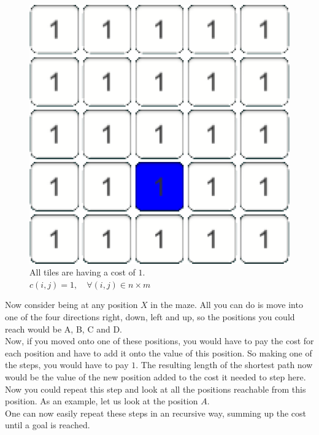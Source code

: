 \documentclass[conference]{IEEEtran}
\begin{document}
\begin{figure}[h]
\centering
\begin{minipage}[t]{0.3\linewidth}
\centering
\includegraphics[width=1\textwidth]{images/ValueFunction/original.png}
\end{minipage}
\caption{All tiles are having a cost of
$1$.\\
$c(i,j) = 1, \quad \forall (i,j) \in n \times m$}
\end{figure}
Now consider being at any position $X$ in the maze. All you can do is move into one of the four directions
right, down, left and up,
so the positions you could reach would be
A, B, C and D.\\
Now, if you moved onto one of these positions, you would have to pay the cost for each position and have to add it onto the value of this position. So making one of the steps, you would have to pay $1$. The resulting length of the shortest path now would be the value of the new position added to the cost it needed to step here.\\
Now you could repeat this step and look at all the positions reachable from this position. As an example, let us look at the position $A$.\\
One can now easily repeat these steps in an recursive way, summing up the cost until a goal is reached.\\
\end{document}
